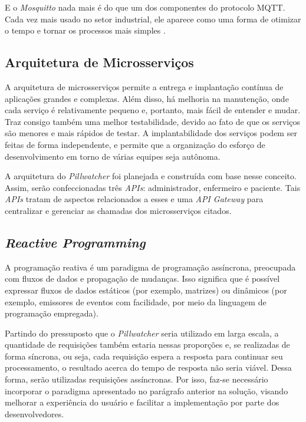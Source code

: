 E o \textit{Mosquitto} nada mais é do que um dos componentes do protocolo MQTT. Cada vez mais usado no setor industrial, ele aparece como uma forma de otimizar o tempo e tornar os processos mais simples \cite{ENGPROCESS_2018}.

\subsection {Arquitetura de Microsserviços}
A arquitetura de microsserviços permite a entrega e implantação contínua de aplicações grandes e complexas. Além disso, há melhoria na manutenção, onde cada serviço é relativamente pequeno e, portanto, mais fácil de entender e mudar. Traz consigo também uma melhor testabilidade, devido ao fato de que os serviços são menores e mais rápidos de testar. A implantabilidade dos serviços podem ser feitas de forma independente, e permite que a organização do esforço de desenvolvimento em torno de várias equipes seja autônoma.

A arquitetura do \textit{Pillwatcher} foi planejada e construída com base nesse conceito. Assim, serão confeccionadas três \textit{APIs}: administrador, enfermeiro e paciente. Tais \textit{APIs} tratam de aspectos relacionados a esses e uma \textit{API Gateway} para centralizar e gerenciar as chamadas dos microsserviços citados.

\subsection {\textit{Reactive Programming}}
A programação reativa é um paradigma de programação assíncrona, preocupada com fluxos de dados e propagação de mudanças. Isso significa que é possível expressar fluxos de dados estáticos (por exemplo, matrizes) ou dinâmicos (por exemplo, emissores de eventos com facilidade, por meio da linguagem de programação empregada).

Partindo do pressuposto que o \textit{Pillwatcher} seria utilizado em larga escala, a quantidade de requisições também estaria nessas proporções e, se realizadas de forma síncrona, ou seja, cada requisição espera a resposta para continuar seu processamento, o resultado acerca do tempo de resposta não seria viável. Dessa forma, serão utilizadas requisições assíncronas. Por isso, faz-se necessário incorporar o paradigma apresentado no parágrafo anterior na solução, visando melhorar a experiência do usuário e facilitar a implementação por parte dos desenvolvedores.